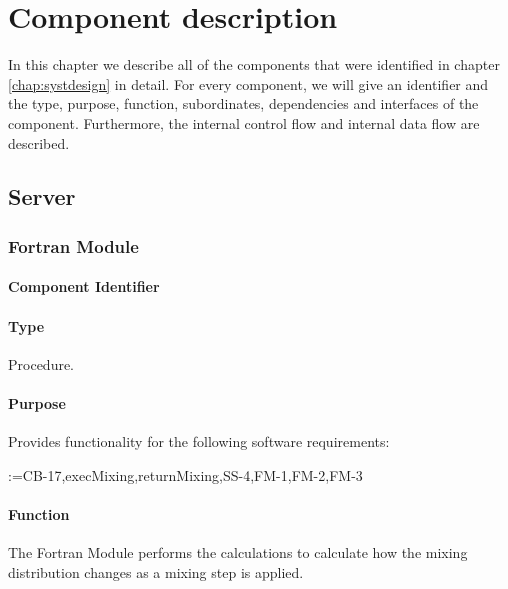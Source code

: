 \makeatletter
\newcommand\addtosrqlist[1]{%
  \def\tempa{}%
  \@for\reserved:=#1\do{%
    \ifx\tempa\empty\else, \fi SRQ\srqref{\reserved}%
    \edef\tempa{something}%
  }
}
\makeatother

\chapter{Component description}
\label{chap:compdescr}
In this chapter we describe all of the components that were identified in chapter \ref{chap:systdesign} in detail. For every component, we will give an identifier and the type, purpose, function, subordinates, dependencies and interfaces of the component. Furthermore, the internal control flow and internal data flow are described.

\section{Server}
\subsection{Fortran Module}
\label{subsec:fortranmodule}

\subsubsection*{Component Identifier}
\RTMSFM{}

\subsubsection*{Type}
Procedure.

\subsubsection*{Purpose}
Provides functionality for the following software requirements:

\noindent \addtosrqlist{CB-17,execMixing,returnMixing,SS-4,FM-1,FM-2,FM-3}

\subsubsection*{Function}
The Fortran Module performs the calculations to calculate how the mixing distribution changes as a mixing step is applied.

